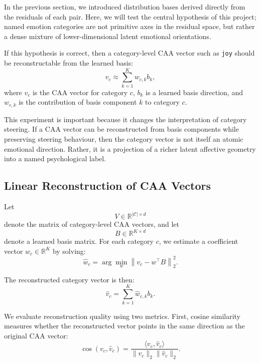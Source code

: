 \documentclass[12pt,twoside]{report}
\begin{document}
In the previous section, we introduced distribution bases derived directly from the residuals of each pair. Here, we will test the central hypothesis of this project; named emotion categories are not primitive axes in the residual space, but rather a dense mixture of lower-dimensional latent emotional orientations.

If this hypothesis is correct, then a category-level CAA vector such as \texttt{joy} should be reconstructable from the learned basis:
\begin{equation}
v_c
\approx
\sum_{k=1}^{K}
w_{c,k} b_k,
\end{equation}
where $v_c$ is the CAA vector for category $c$, $b_k$ is a learned basis direction, and $w_{c,k}$ is the contribution of basis component $k$ to category $c$.

This experiment is important because it changes the interpretation of category steering. If a CAA vector can be reconstructed from basis components while preserving steering behaviour, then the category vector is not itself an atomic emotional direction. Rather, it is a projection of a richer latent affective geometry into a named psychological label.

\subsection{Linear Reconstruction of CAA Vectors}
\label{sec:emotion_code:caa_basis_decomposition:ols}

Let
\[
V \in \mathbb{R}^{|\mathcal{C}|\times d}
\]
denote the matrix of category-level CAA vectors, and let
\[
B \in \mathbb{R}^{K\times d}
\]
denote a learned basis matrix. For each category $c$, we  estimate a coefficient vector $w_c\in\mathbb{R}^K$ by solving:
\begin{equation}
\hat w_c
=
\arg\min_{w}
\left\|
v_c - w^\top B
\right\|_2^2.
\end{equation}

The reconstructed category vector is then:
\begin{equation}
\hat v_c
=
\sum_{k=1}^{K}
\hat w_{c,k} b_k.
\end{equation}

We evaluate reconstruction quality using two metrics. First, cosine similarity measures whether the reconstructed vector points in the same direction as the original CAA vector:
\begin{equation}
\cos(v_c,\hat v_c)
=
\frac{
\langle v_c,\hat v_c\rangle
}{
\|v_c\|_2\|\hat v_c\|_2
}.
\end{equation}
\end{document}
